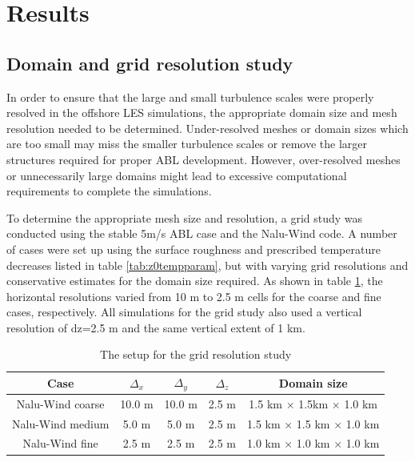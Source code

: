 \section{Results}

\subsection{\label{sec:gridstudy}Domain and grid resolution study}

In order to ensure that the large and small turbulence scales were
properly resolved in the offshore LES simulations, the appropriate
domain size and mesh resolution needed to be determined.
Under-resolved meshes or domain sizes which are too small may miss the
smaller turbulence scales or remove the larger structures required for
proper ABL development.  However, over-resolved meshes or
unnecessarily large domains might lead to excessive computational
requirements to complete the simulations.

To determine the appropriate mesh size and resolution, a grid study
was conducted using the stable 5m/s ABL case and the Nalu-Wind code.
A number of cases were set up using the surface roughness and
prescribed temperature decreases listed in table
\ref{tab:z0tempparam}, but with varying grid resolutions and
conservative estimates for the domain size required.  As shown in
table \ref{tab:GridStudySetup}, the horizontal resolutions varied from
10 m to 2.5 m cells for the coarse and fine cases, respectively.  All
simulations for the grid study also used a vertical resolution of
dz=2.5 m and the same vertical extent of 1 km.

\begin{table}
\caption{\label{tab:GridStudySetup} The setup for the grid resolution study} \centering
\begin{tabular}{ccccc}
  \hline
  Case              & $\Delta_x$ & $\Delta_y$ & $\Delta_z$ & Domain size \\
  \hline
  Nalu-Wind coarse  &  10.0 m  & 10.0 m & 2.5 m & 1.5 km $\times$ 1.5km $\times$ 1.0 km  \\
  Nalu-Wind medium  &   5.0 m &  5.0 m  & 2.5 m & 1.5 km $\times$ 1.5 km $\times$ 1.0 km  \\
  Nalu-Wind fine    &   2.5 m &  2.5 m  & 2.5 m & 1.0 km $\times$ 1.0 km $\times$ 1.0 km  \\
\hline
\end{tabular}
\end{table}

